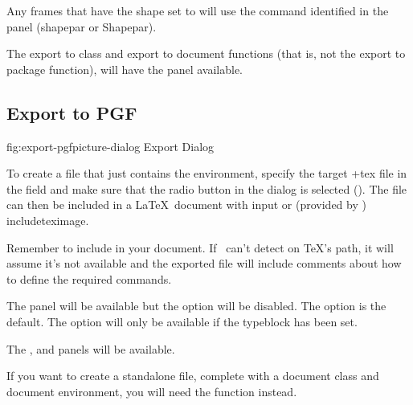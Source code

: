 
Any frames that have the shape set to
 will use the command identified
in the  panel (\gls{shapepar} or
\gls{Shapepar}).

The export to class and export to document functions (that is, not the
export to package function), will have the
 panel available.


\subsection{Export to PGF}\label{sec:exportpgf}


\FloatFig
 {fig:export-pgfpicture-dialog}
 {}
 {Export Dialog}

To create a file that just contains the  environment, 
specify the target \ext+{tex}
file in the  field and make sure that the
 radio button in the  dialog is selected
(). 
The file can then be included in a \LaTeX\ document with \gls{input}
or (provided by ) \gls{includeteximage}.

Remember to include  in your document. If
\FlowframTk\ can't detect  on \TeX's path, it
will assume it's not available and the exported file will include
comments about how to define the required commands.

The  panel will be available but the
 option will be disabled.
The  option is the default.
The  option will only be available
if the \gls{typeblock} has been set.

The , 
and  panels will be available. 

If you want to create a standalone file, complete with a document
class and document environment, you will need the
 function instead.



